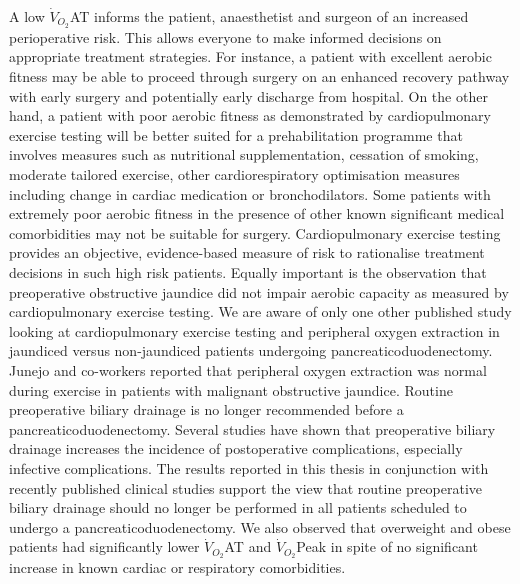 A low $\dot{V}_{O_2}$AT informs the patient, anaesthetist and surgeon of an increased perioperative risk. 
This allows everyone to make informed decisions on appropriate treatment strategies. 
For instance, a patient with excellent aerobic fitness may be able to proceed through surgery on an enhanced recovery pathway with early surgery and potentially early discharge from hospital. 
On the other hand, a patient with poor aerobic fitness as demonstrated by cardiopulmonary exercise testing will be better suited for a prehabilitation programme that involves measures such as nutritional supplementation, cessation of smoking, moderate tailored exercise, other cardiorespiratory optimisation measures including change in cardiac medication or bronchodilators. 
Some patients with extremely poor aerobic fitness in the presence of other known significant medical comorbidities may not be suitable for surgery. 
Cardiopulmonary exercise testing provides an objective, evidence-based measure of risk to rationalise treatment decisions in such high risk patients.
Equally important is the observation that preoperative obstructive jaundice did not impair aerobic capacity as measured by cardiopulmonary exercise testing. 
We are aware of only one other published study looking at cardiopulmonary exercise testing and peripheral oxygen extraction in jaundiced versus non-jaundiced patients undergoing pancreaticoduodenectomy. 
Junejo and co-workers reported that peripheral oxygen extraction was normal during exercise in patients with malignant obstructive jaundice.\parencite{junejo_peripheral_2014} 
Routine preoperative biliary drainage is no longer recommended before a pancreaticoduodenectomy. 
Several studies have shown that preoperative biliary drainage increases the incidence of postoperative complications, especially infective complications. \parencite{van_der_gaag_preoperative_2010, arkadopoulos_preoperative_2014, fujii_preoperative_2015, furukawa_negative_2015}
The results reported in this thesis in conjunction with recently published clinical studies support the view that routine preoperative biliary drainage should no longer be performed in all patients scheduled to undergo a pancreaticoduodenectomy.
We also observed that overweight and obese patients had significantly lower $\dot{V}_{O_2}$AT and $\dot{V}_{O_2}$Peak in spite of no significant increase in known cardiac or respiratory comorbidities. 

